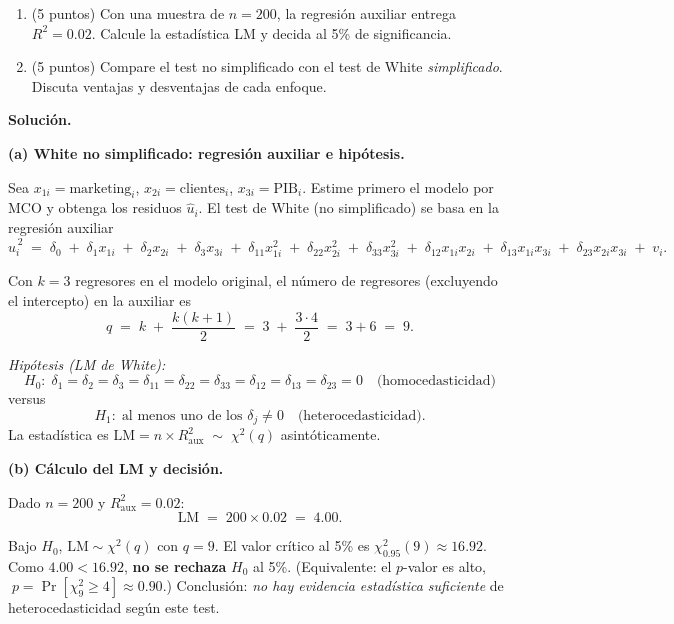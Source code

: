 \documentclass[10pt,a4paper]{article}
\begin{document}
\begin{enumerate}
\begin{enumerate}
\begin{enumerate}
\item (5 puntos) Con una muestra de \(n=200\), la regresión auxiliar entrega \(R^2 = 0{.}02\).
Calcule la estadística LM y decida al 5\% de significancia.

\item (5 puntos) Compare el test no simplificado con el test de White \emph{simplificado}. Discuta ventajas y desventajas de cada enfoque.
\end{enumerate}


\textbf{Solución.}

\textbf{(a) White no simplificado: regresión auxiliar e hipótesis.}

Sea \(x_{1i}=\text{marketing}_i\), \(x_{2i}=\text{clientes}_i\), \(x_{3i}=\text{PIB}_i\).
Estime primero el modelo por MCO y obtenga los residuos \(\hat u_i\).
El test de White (no simplificado) se basa en la regresión auxiliar
\[
\hat u_i^{\,2} \;=\; \delta_0 \;+\; \delta_1 x_{1i} \;+\; \delta_2 x_{2i} \;+\; \delta_3 x_{3i}
\;+\; \delta_{11} x_{1i}^2 \;+\; \delta_{22} x_{2i}^2 \;+\; \delta_{33} x_{3i}^2
\;+\; \delta_{12} x_{1i}x_{2i} \;+\; \delta_{13} x_{1i}x_{3i} \;+\; \delta_{23} x_{2i}x_{3i} \;+\; v_i.
\]

Con \(k=3\) regresores en el modelo original, el número de regresores (excluyendo el intercepto) en la auxiliar es
\[
q \;=\; k \;+\; \frac{k(k+1)}{2}
\;=\; 3 \;+\; \frac{3\cdot 4}{2}
\;=\; 3 + 6 \;=\; 9.
\]

\noindent\emph{Hipótesis (LM de White):}
\[
H_0:\; \delta_1=\delta_2=\delta_3=\delta_{11}=\delta_{22}=\delta_{33}=\delta_{12}=\delta_{13}=\delta_{23}=0
\quad\text{(homocedasticidad)}
\]
versus
\[
H_1:\; \text{al menos uno de los } \delta_j \neq 0
\quad\text{(heterocedasticidad)}.
\]
La estadística es \(\text{LM} = n \times R^2_{\text{aux}} \;\sim\; \chi^2(q)\) asintóticamente.

\medskip
\textbf{(b) Cálculo del LM y decisión.}

Dado \(n=200\) y \(R^2_{\text{aux}}=0{.}02\):
\[
\text{LM} \;=\; 200 \times 0{.}02 \;=\; 4{.}00.
\]

Bajo \(H_0\), \(\text{LM}\sim \chi^2(q)\) con \(q=9\).
El valor crítico al 5\% es \(\chi^2_{0.95}(9)\approx 16{.}92\).
Como \(4{.}00 < 16{.}92\), \textbf{no se rechaza} \(H_0\) al 5\%.
(Equivalente: el \(p\)-valor es alto, \(\;p=\Pr[\chi^2_9\ge 4]\approx 0{.}90\).)
Conclusión: \emph{no hay evidencia estadística suficiente} de heterocedasticidad según este test.


\end{enumerate}
\end{enumerate}
\end{document}
